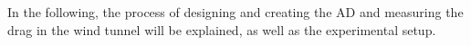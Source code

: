 
In the following, the process of designing and creating the \gls{AD} and measuring the drag in the wind tunnel will be explained, as well as the experimental setup. 





